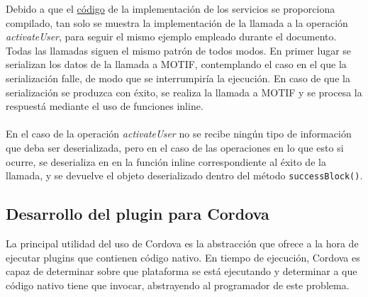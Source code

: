 \documentclass[a4paper, 12pt]{article}
\begin{document}
\bigbreak
Debido a que el \hyperref[code:ios-implementation]{código} de la implementación de los servicios se proporciona compilado, tan solo se muestra la implementación de la llamada a la operación \emph{activateUser},
para seguir el mismo ejemplo empleado durante el documento. Todas las llamadas siguen el mismo patrón de todos modos. En primer lugar se serializan los datos de la llamada a MOTIF, contemplando el caso en
el que la serialización falle, de modo que se interrumpiría la ejecución. En caso de que la serialización se produzca con éxito, se realiza la llamada a MOTIF y se procesa la respuestá mediante el uso de
funciones inline.
\\
\\
En el caso de la operación \emph{activateUser} no se recibe ningún tipo de información que deba ser deserializada, pero en el caso de las operaciones en lo que esto si ocurre, se deserializa en en la función inline
correspondiente al éxito de la llamada, y se devuelve el objeto deserializado dentro del método \verb~successBlock()~.
\subsection{Desarrollo del plugin para Cordova}
\label{sec-4-3}
La principal utilidad del uso de Cordova es la abstracción que ofrece a la hora de ejecutar plugins que contienen código nativo. En tiempo de ejecución, Cordova es capaz de determinar sobre que plataforma
se está ejecutando y determinar a que código nativo tiene que invocar, abstrayendo al programador de este problema.
\end{document}
